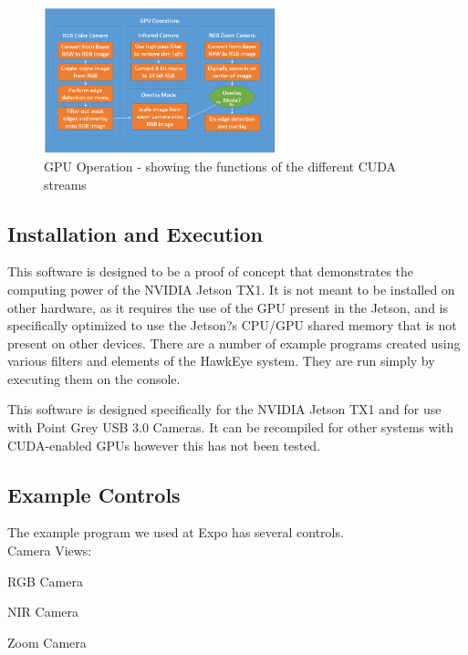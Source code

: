 \begin{figure}[H] 
	\centering
	\includegraphics[width=0.6\textwidth,natwidth=610,natheight=642]{images/GPU.png}
	\caption{GPU Operation - showing the functions of the different CUDA streams}  
	\end{figure}
	
\subsection{Installation and Execution}
This software is designed to be a proof of concept that demonstrates the computing power of the NVIDIA Jetson TX1. It is not meant to be installed on other hardware, as it requires the use of the GPU present in the Jetson, and is specifically optimized to use the Jetson?s CPU/GPU shared memory that is not present on other devices. There are a number of example programs created using various filters and elements of the HawkEye system. They are run simply by executing them on the console.
\par
This software is designed specifically for the NVIDIA Jetson TX1 and for use with Point Grey USB 3.0 Cameras. It can be recompiled for other systems with CUDA-enabled GPUs however this has not been tested.

\subsection {Example Controls}
The example program we used at Expo has several controls.\\

Camera Views:
\begin{description}[leftmargin=2cm,labelindent=2cm]
	\item[{[1]}] RGB Camera
	\item[{[2]}] NIR Camera
	\item[{[3]}] Zoom Camera\\
\end{description}


